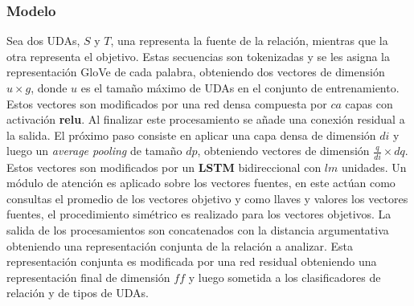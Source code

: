 \subsubsection{Modelo}

Sea dos UDAs, $S$ y $T$, una representa la fuente de la relación, mientras que la otra representa
el objetivo. Estas secuencias son tokenizadas y se les asigna la representación GloVe de cada palabra, obteniendo
dos vectores de dimensión $u \times g$, donde $u$ es el tamaño máximo de UDAs en el conjunto de entrenamiento.
Estos vectores son modificados por una red densa compuesta por $ca$ capas con activación \textbf{relu}. 
Al finalizar este procesamiento se añade una conexión residual
a la salida. El próximo paso consiste en aplicar una capa densa de dimensión $di$ y luego un \emph{average pooling}
de tamaño $dp$, obteniendo vectores de dimensión $\frac{q}{di} \times dq$. 
Estos vectores son modificados por un \textbf{LSTM} bidireccional con $lm$ unidades. Un módulo de atención es aplicado 
sobre los vectores fuentes, 
en este actúan como consultas el promedio de los vectores objetivo y como llaves y valores los vectores fuentes,
el procedimiento simétrico es realizado para los vectores objetivos.
La salida de los procesamientos son concatenados con la distancia argumentativa obteniendo una representación 
conjunta de la relación a analizar. Esta representación conjunta es modificada por una red residual obteniendo
una representación final de dimensión $ff$ y luego sometida a los clasificadores de relación y de tipos de UDAs.

